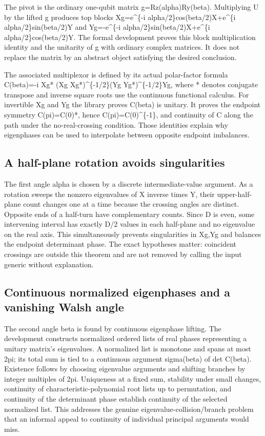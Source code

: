 \documentclass[11pt,a4paper]{article}
\begin{document}
The pivot is the ordinary one-qubit matrix g=Rz(alpha)Ry(beta). Multiplying U by the lifted g produces top blocks Xg=e\textasciicircum{}\{-i alpha/2\}cos(beta/2)X+e\textasciicircum{}\{i alpha/2\}sin(beta/2)Y and Yg=-e\textasciicircum{}\{-i alpha/2\}sin(beta/2)X+e\textasciicircum{}\{i alpha/2\}cos(beta/2)Y. The formal development proves this block multiplication identity and the unitarity of g with ordinary complex matrices. It does not replace the matrix by an abstract object satisfying the desired conclusion.

The associated multiplexor is defined by its actual polar-factor formula
C(beta)=-i Xg* (Xg Xg*)\textasciicircum{}\{-1/2\}(Yg Yg*)\textasciicircum{}\{-1/2\}Yg,
where * denotes conjugate transpose and inverse square roots use the continuous functional calculus. For invertible Xg and Yg the library proves C(beta) is unitary. It proves the endpoint symmetry C(pi)=C(0)*, hence C(pi)=C(0)\textasciicircum{}\{-1\}, and continuity of C along the path under the no-real-crossing condition. Those identities explain why eigenphases can be used to interpolate between opposite endpoint imbalances.

\subsection{A half-plane rotation avoids singularities}
The first angle alpha is chosen by a discrete intermediate-value argument. As a rotation sweeps the nonzero eigenvalues of X inverse times Y, their upper-half-plane count changes one at a time because the crossing angles are distinct. Opposite ends of a half-turn have complementary counts. Since D is even, some intervening interval has exactly D/2 values in each half-plane and no eigenvalue on the real axis. This simultaneously prevents singularities in Xg,Yg and balances the endpoint determinant phase. The exact hypotheses matter: coincident crossings are outside this theorem and are not removed by calling the input generic without explanation.

\subsection{Continuous normalized eigenphases and a vanishing Walsh angle}
The second angle beta is found by continuous eigenphase lifting. The development constructs normalized ordered lists of real phases representing a unitary matrix's eigenvalues. A normalized list is monotone and spans at most 2pi; its total sum is tied to a continuous argument sigma(beta) of det C(beta). Existence follows by choosing eigenvalue arguments and shifting branches by integer multiples of 2pi. Uniqueness at a fixed sum, stability under small changes, continuity of characteristic-polynomial root lists up to permutation, and continuity of the determinant phase establish continuity of the selected normalized list. This addresses the genuine eigenvalue-collision/branch problem that an informal appeal to continuity of individual principal arguments would miss.
\end{document}
